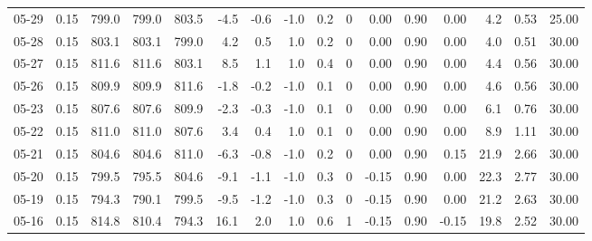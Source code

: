 \begin{threeparttable}
{\begin{tabular}{lrrrrrrrrrrrrrrr}
  05-29 &     0.15 & 799.0 & 799.0 & 803.5 &       -4.5 &           -0.6 &                     -1.0 &                 0.2 &              0 &       0.00 &      0.90 &           0.00 &              4.2 &            0.53 &                  25.00 \\
  05-28 &     0.15 & 803.1 & 803.1 & 799.0 &        4.2 &            0.5 &                      1.0 &                 0.2 &              0 &       0.00 &      0.90 &           0.00 &              4.0 &            0.51 &                  30.00 \\
  05-27 &     0.15 & 811.6 & 811.6 & 803.1 &        8.5 &            1.1 &                      1.0 &                 0.4 &              0 &       0.00 &      0.90 &           0.00 &              4.4 &            0.56 &                  30.00 \\
  05-26 &     0.15 & 809.9 & 809.9 & 811.6 &       -1.8 &           -0.2 &                     -1.0 &                 0.1 &              0 &       0.00 &      0.90 &           0.00 &              4.6 &            0.56 &                  30.00 \\
  05-23 &     0.15 & 807.6 & 807.6 & 809.9 &       -2.3 &           -0.3 &                     -1.0 &                 0.1 &              0 &       0.00 &      0.90 &           0.00 &              6.1 &            0.76 &                  30.00 \\
  05-22 &     0.15 & 811.0 & 811.0 & 807.6 &        3.4 &            0.4 &                      1.0 &                 0.1 &              0 &       0.00 &      0.90 &           0.00 &              8.9 &            1.11 &                  30.00 \\
  05-21 &     0.15 & 804.6 & 804.6 & 811.0 &       -6.3 &           -0.8 &                     -1.0 &                 0.2 &              0 &       0.00 &      0.90 &           0.15 &             21.9 &            2.66 &                  30.00 \\
  05-20 &     0.15 & 799.5 & 795.5 & 804.6 &       -9.1 &           -1.1 &                     -1.0 &                 0.3 &              0 &      -0.15 &      0.90 &           0.00 &             22.3 &            2.77 &                  30.00 \\
  05-19 &     0.15 & 794.3 & 790.1 & 799.5 &       -9.5 &           -1.2 &                     -1.0 &                 0.3 &              0 &      -0.15 &      0.90 &           0.00 &             21.2 &            2.63 &                  30.00 \\
  05-16 &     0.15 & 814.8 & 810.4 & 794.3 &       16.1 &            2.0 &                      1.0 &                 0.6 &              1 &      -0.15 &      0.90 &          -0.15 &             19.8 &            2.52 &                  30.00 \\

\end{tabular}}
\end{threeparttable}

